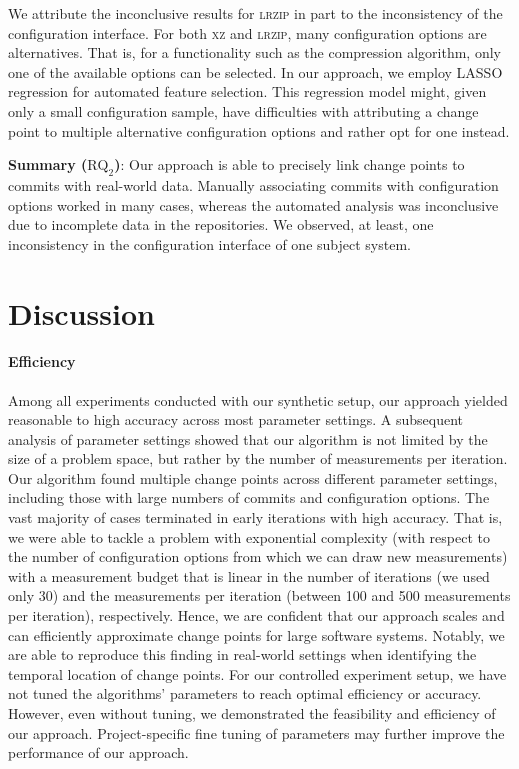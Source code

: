 \documentclass[sigconf, screen]{acmart}
\newcommand{\greybox}[1]{
	\begin{mdframed}[backgroundcolor=black!10!white,linewidth=0pt,backgroundcolor=indigo2!10,linewidth=0pt,innerleftmargin=5pt,innertopmargin=5pt]
		#1
	\end{mdframed}
}
\begin{document}
	We attribute the inconclusive results for \textsc{lrzip} in part to the inconsistency of the configuration interface. For both \textsc{xz} and \textsc{lrzip}, many configuration options are alternatives. That is, for a functionality such as the compression algorithm, only one of the available options can be selected. In our approach, we employ LASSO regression for automated feature selection. This regression model might, given only a small configuration sample, have difficulties with attributing a change point to multiple alternative configuration options and rather opt for one instead.  %
	\vspace{2mm}
	\greybox{
		\textbf{Summary ($\text{RQ}_2$)}: Our approach is able to precisely link change points to commits with real-world data. Manually associating commits with configuration options worked in many cases, whereas the automated analysis was inconclusive due to incomplete data in the repositories. We observed, at least, one inconsistency in the configuration interface of one subject system.
	}
	
	\section{Discussion}\label{sec:discussion}
	\paragraph{Efficiency} Among all experiments conducted with our synthetic setup, our approach yielded reasonable to high accuracy across most parameter settings. A subsequent analysis of parameter settings showed that our algorithm is not limited by the size of a problem space, but rather by the number of measurements per iteration. 
	Our algorithm found multiple change points across different parameter settings, including those with large numbers of commits and configuration options. 
	The vast majority of cases terminated in early iterations with high accuracy. That is, we were able to tackle a problem with exponential complexity (with respect to the number of configuration options from which we can draw new measurements) with a measurement budget that is linear in the number of iterations (we used only 30) and the measurements per iteration (between 100 and 500 measurements per iteration), respectively.
	Hence, we are confident that our approach scales and can efficiently approximate change points for large software systems. Notably, we are able to reproduce this finding in real-world settings when identifying the temporal location of change points. For our controlled experiment setup, we have not tuned the algorithms’ parameters to reach optimal efficiency or accuracy. However, even without tuning, we demonstrated the feasibility and efficiency of our approach. Project-specific fine tuning of parameters may further improve the performance of our approach.
	
\end{document}
